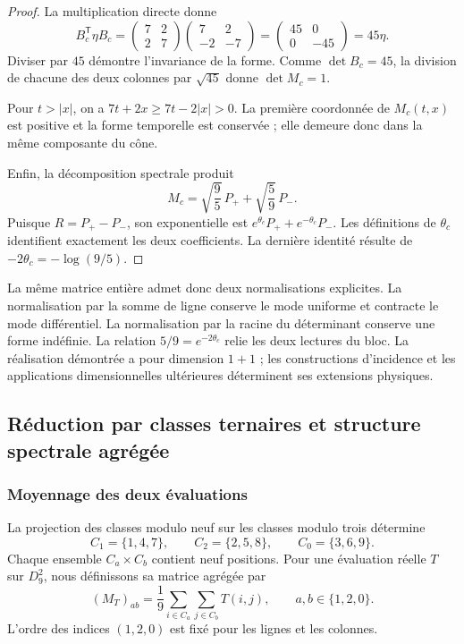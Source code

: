 \begin{proof}
La multiplication directe donne
\[
 B_c^{\mathsf T}\eta B_c
 =\begin{pmatrix}7&2\\2&7\end{pmatrix}
  \begin{pmatrix}7&2\\-2&-7\end{pmatrix}
 =\begin{pmatrix}45&0\\0&-45\end{pmatrix}
 =45\eta.
\]
Diviser par $45$ démontre l'invariance de la forme. Comme $\det B_c=45$, la division de chacune des deux colonnes par $\sqrt{45}$ donne $\det M_c=1$.

Pour $t>|x|$, on a $7t+2x\geq7t-2|x|>0$. La première coordonnée de $M_c(t,x)$ est positive et la forme temporelle est conservée ; elle demeure donc dans la même composante du cône.

Enfin, la décomposition spectrale produit
\[
 M_c=\sqrt{\frac95}\,P_++\sqrt{\frac59}\,P_-.
\]
Puisque $R=P_+-P_-$, son exponentielle est $e^{\theta_c}P_++e^{-\theta_c}P_-$. Les définitions de $\theta_c$ identifient exactement les deux coefficients. La dernière identité résulte de $-2\theta_c=-\log(9/5)$.
\end{proof}

La même matrice entière admet donc deux normalisations explicites. La normalisation par la somme de ligne conserve le mode uniforme et contracte le mode différentiel. La normalisation par la racine du déterminant conserve une forme indéfinie. La relation $5/9=e^{-2\theta_c}$ relie les deux lectures du bloc. La réalisation démontrée a pour dimension $1+1$ ; les constructions d'incidence et les applications dimensionnelles ultérieures déterminent ses extensions physiques.

\subsection{Réduction par classes ternaires et structure spectrale agrégée}
\label{geo:agregacion}

\subsubsection{Moyennage des deux évaluations}

La projection des classes modulo neuf sur les classes modulo trois détermine
\[
 C_1=\{1,4,7\},\qquad
 C_2=\{2,5,8\},\qquad
 C_0=\{3,6,9\}.
\]
Chaque ensemble $C_a\times C_b$ contient neuf positions. Pour une évaluation réelle $T$ sur $D_9^2$, nous définissons sa matrice agrégée par
\[
 (M_T)_{ab}=\frac19\sum_{i\in C_a}\sum_{j\in C_b}T(i,j),
 \qquad a,b\in\{1,2,0\}.
\]
L'ordre des indices $(1,2,0)$ est fixé pour les lignes et les colonnes.

